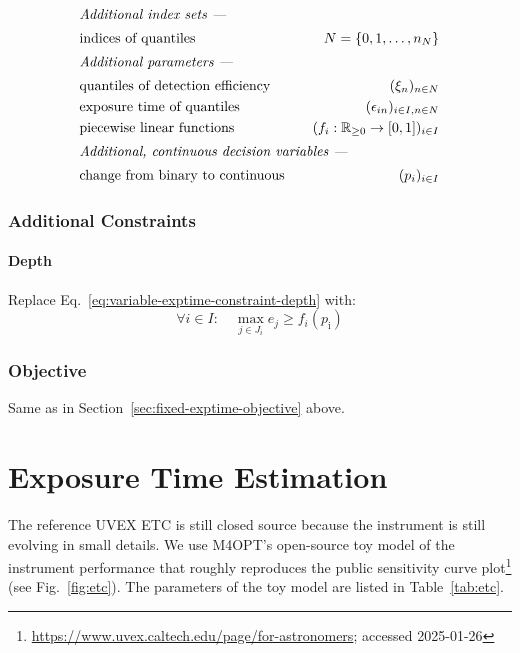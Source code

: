 \documentclass[twocolumn,times]{aastex631}
\begin{document}
\begin{alignat*}{3}
\intertext{\it Additional index sets ---}
    &\text{indices of quantiles}&\quad
        N = \{0, 1, \dots, n_N\} \\
\intertext{\it Additional parameters ---}
    &\text{quantiles of detection efficiency}&\quad
        (\xi_n)_{n \in N} \\
    &\text{exposure time of quantiles}&\quad
        (\epsilon_{in})_{i \in I, n \in N} \\
    &\text{piecewise linear functions}&\quad
        (f_i: \mathbb{R}_{\geq 0} \rightarrow [0, 1])_{i \in I} \\
\intertext{\it Additional, continuous decision variables ---}
    &\text{change from binary to continuous}&\quad (p_i)_{i \in I}
\end{alignat*}

\subsubsection{Additional Constraints}

\paragraph{Depth}
Replace Eq.~\ref{eq:variable-exptime-constraint-depth} with:
%
$$
    \forall i \in I :\quad \max_{j \in J_i} e_{j} \geq f_i(p_\mathrm{i})
$$

\subsubsection{Objective}

Same as in Section~\ref{sec:fixed-exptime-objective} above.

\section{Exposure Time Estimation}

The reference \ac{UVEX} \ac{ETC} is still closed source because the instrument is still evolving in small details. We use \ac{M4OPT}'s open-source toy model of the instrument performance that roughly reproduces the public sensitivity curve plot\footnote{\url{https://www.uvex.caltech.edu/page/for-astronomers}; accessed 2025-01-26} (see Fig.~\ref{fig:etc}). The parameters of the toy model are listed in Table~\ref{tab:etc}.
\end{document}
